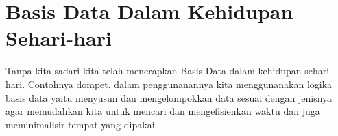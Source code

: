 \documentclass{article}
\begin{document}
\section{Basis Data Dalam Kehidupan Sehari-hari}
Tanpa kita sadari kita telah menerapkan Basis Data dalam kehidupan sehari-hari. Contohnya dompet, dalam penggunanannya kita menggunanakan logika basis data yaitu menyusun dan mengelompokkan data sesuai dengan jenisnya agar memudahkan kita untuk mencari dan mengefisienkan waktu dan juga meminimalisir tempat yang dipakai.


\end{document}
